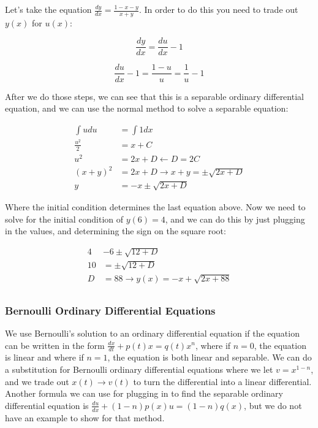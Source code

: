     \begin{problem}
      Let's take the equation $\frac{dy}{dx}=\frac{1-x-y}{x+y}$. In order to do this you need to trade out $y(x)$ for $u(x)$:

      \[
        \frac{dy}{dx}=\frac{du}{dx}-1
      \]

      \[
        \frac{du}{dx}-1=\frac{1-u}{u}=\frac{1}{u}-1
      \]

      After we do those steps, we can see that this is a separable ordinary differential equation, and we can use the normal method to solve a separable equation:

      \[
        \begin{aligned}
          \int udu&=\int1dx\\
          \frac{u^2}{2}&=x+C\\
          u^2&=2x+D\leftarrow D=2C\\
          (x+y)^2&=2x+D\rightarrow x+y=\pm\sqrt{2x+D}\\
          y&=-x\pm\sqrt{2x+D}
        \end{aligned}
      \]

      Where the initial condition determines the last equation above. Now we need to solve for the initial condition of $y(6)=4$, and we can do this by just plugging in the values, and determining the sign on the square root:

      \[
        \begin{aligned}
           4&-6\pm\sqrt{12+D}\\
          10&=\pm\sqrt{12+D}\\
          D&=88\to y(x)=-x+\sqrt{2x+88}\\
        \end{aligned}
      \]
    \end{problem}

  \subsubsection{Bernoulli Ordinary Differential Equations}

    We use Bernoulli's solution to an ordinary differential equation if the equation can be written in the form $\frac{dx}{dt}+p(t)x=q(t)x^n$, where if $n=0$, the equation is linear and where if $n=1$, the equation is both linear and separable. We can do a substitution for Bernoulli ordinary differential equations where we let $v=x^{1-n}$, and we trade out $x(t)\to v(t)$ to turn the differential into a linear differential. Another formula we can use for plugging in to find the separable ordinary differential equation is $\frac{du}{dx}+(1-n)p(x)u=(1-n)q(x)$, but we do not have an example to show for that method. 


